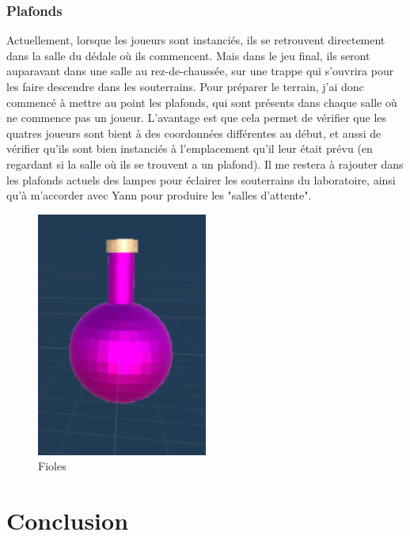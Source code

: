 \documentclass{article}
\begin{document}
\subsubsection{Plafonds}

Actuellement, lorsque les joueurs sont instanciés, ils se retrouvent directement dans la salle du dédale où ils commencent. Mais dans le jeu final, ils seront auparavant dans une salle au rez-de-chaussée, sur une trappe qui s'ouvrira pour les faire descendre dans les souterrains. Pour préparer le terrain, j'ai donc commencé à mettre au point les plafonds, qui sont présents dans chaque salle où ne commence pas un joueur. L'avantage est que cela permet de vérifier que les quatres joueurs sont bient à des coordonnées différentes au début, et aussi de vérifier qu'ils sont bien instanciés à l'emplacement qu'il leur était prévu (en regardant si la salle où ils se trouvent a un plafond).
Il me restera à rajouter dans les plafonds actuels des lampes pour éclairer les souterrains du laboratoire, ainsi qu'à m'accorder avec Yann pour produire les "salles d'attente".

\par\vspace{0.5cm}
\begin{figure}[!ht]
    \centering
    \includegraphics[width=0.5\textwidth]{Fioles.PNG}
    \caption{Fioles}
    \label{Fioles}
\end{figure}{}

\newpage
\section{Conclusion}
\end{document}
